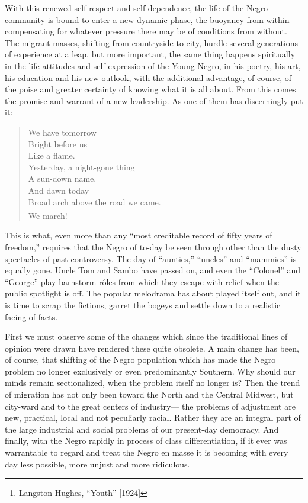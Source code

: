 \documentclass[12pt]{article}
\begin{document}
With this renewed self-respect and self-dependence, the life of the Negro community is bound to enter a new dynamic phase, the buoyancy from within compensating for whatever pressure there may be of conditions from without. The migrant masses, shifting from countryside to city, hurdle several generations of experience at a leap, but more important, the same thing happens spiritually in the life-attitudes and self-expression of the Young Negro, in his poetry, his art, his education and his new outlook, with the additional advantage, of course, of the poise and greater certainty of knowing what it is all about. From this comes the promise and warrant of a new leadership. As one of them has discerningly put it:

\begin{quote}
   We have tomorrow\\
   Bright before us\\
   Like a flame.\\
   Yesterday, a night-gone thing\\
   A sun-down name.\\
   And dawn today\\
   Broad arch above the road we came.\\
   We march!\footnote{Langston Hughes, ``Youth'' [1924]}
\end{quote}

This is what, even more than any ``most creditable record of fifty years of freedom,'' requires that the Negro of to-day be seen through other than the dusty spectacles of past controversy. The day of ``aunties,'' ``uncles'' and ``mammies'' is equally gone. Uncle Tom and Sambo have passed on, and even the ``Colonel'' and ``George'' play barnstorm rôles from which they escape with relief when the public spotlight is off. The popular melodrama has about played itself out, and it is time to scrap the fictions, garret the bogeys and settle down to a realistic facing of facts.

First we must observe some of the changes which since the traditional lines of opinion were drawn have rendered these quite obsolete. A main change has been, of course, that shifting of the Negro population which has made the Negro problem no longer exclusively or even predominantly Southern. Why should our minds remain sectionalized, when the problem itself no longer is? Then the trend of migration has not only been toward the North and the Central Midwest, but city-ward and to the great centers of industry--- the problems of adjustment are new, practical, local and not peculiarly racial. Rather they are an integral part of the large industrial and social problems of our present-day democracy. And finally, with the Negro rapidly in process of class differentiation, if it ever was warrantable to regard and treat the Negro en masse it is becoming with every day less possible, more unjust and more ridiculous.
\end{document}
